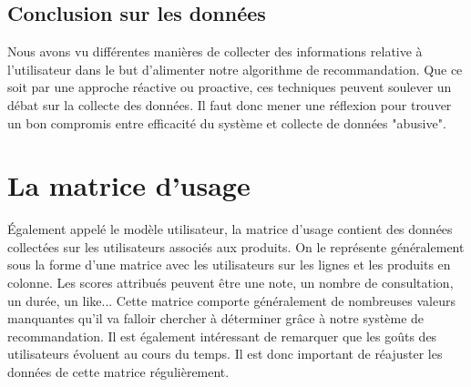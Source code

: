 \documentclass{report}
\begin{document}
\subsection{Conclusion sur les données}
Nous avons vu différentes manières de collecter des informations relative à l'utilisateur dans le but d'alimenter notre algorithme de recommandation. Que ce soit par une approche réactive ou proactive, ces techniques peuvent soulever un débat sur la collecte des données. Il faut donc mener une réflexion pour trouver un bon compromis entre efficacité du système et collecte de données "abusive".

\section{La matrice d'usage}
Également appelé le modèle utilisateur, la matrice d'usage contient des données collectées sur les utilisateurs associés aux produits. On le représente généralement sous la forme d'une matrice avec les utilisateurs sur les lignes et les produits en colonne. Les scores attribués peuvent être une note, un nombre de consultation, un durée, un like... Cette matrice comporte généralement de nombreuses valeurs manquantes qu'il va falloir chercher à déterminer grâce à notre système de recommandation.  Il est également intéressant de remarquer que les goûts des utilisateurs évoluent au cours du temps. Il est donc important de réajuster les données de cette matrice régulièrement.
\end{document}
